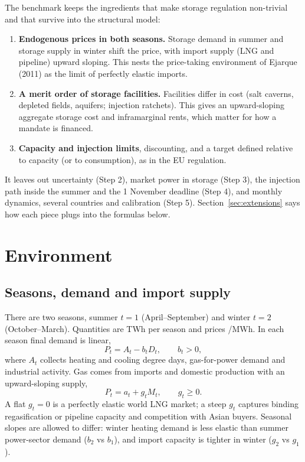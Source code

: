 \documentclass[11pt]{article}
\providecommand{\euro}{\texteuro}
\theoremstyle{definition}
\begin{document}
The benchmark keeps the ingredients that make storage regulation non-trivial and that survive into
the structural model:
\begin{enumerate}
\item \textbf{Endogenous prices in both seasons.} Storage demand in summer and storage supply in
winter shift the price, with import supply (LNG and pipeline) upward sloping. This nests the
price-taking environment of Ejarque (2011) as the limit of perfectly elastic imports.
\item \textbf{A merit order of storage facilities.} Facilities differ in cost (salt caverns,
depleted fields, aquifers; injection ratchets). This gives an upward-sloping aggregate storage cost
and inframarginal rents, which matter for how a mandate is financed.
\item \textbf{Capacity and injection limits}, discounting, and a target defined relative to capacity
(or to consumption), as in the EU regulation.
\end{enumerate}
It leaves out uncertainty (Step 2), market power in storage (Step 3), the injection path inside the
summer and the 1 November deadline (Step 4), and monthly dynamics, several countries and calibration
(Step 5). Section~\ref{sec:extensions} says how each piece plugs into the formulas below.

\section{Environment}

\subsection{Seasons, demand and import supply}
There are two seasons, summer $t=1$ (April--September) and winter $t=2$ (October--March).
Quantities are TWh per season and prices \euro/MWh. In each season final demand is linear,
\begin{equation}
P_t = A_t - b_t D_t, \qquad b_t>0,
\end{equation}
where $A_t$ collects heating and cooling degree days, gas-for-power demand and industrial activity.
Gas comes from imports and domestic production with an upward-sloping supply,
\begin{equation}
P_t = a_t + g_t M_t, \qquad g_t\ge 0.
\end{equation}
A flat $g_t=0$ is a perfectly elastic world LNG market; a steep $g_t$ captures binding regasification
or pipeline capacity and competition with Asian buyers. Seasonal slopes are allowed to differ:
winter heating demand is less elastic than summer power-sector demand ($b_2$ vs $b_1$), and import
capacity is tighter in winter ($g_2$ vs $g_1$).
\end{document}
